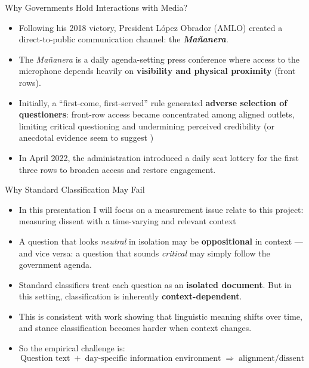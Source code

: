 \documentclass[10pt,aspectratio=169]{beamer}
\begin{document}
\begin{frame}{Why Governments Hold Interactions with Media?}
\begin{itemize}
  \setlength\itemsep{1em}


  \item Following his 2018 victory, President L\'opez Obrador (AMLO) created a direct-to-public communication channel: the \textbf{\textit{Mañanera}}.

  \item The \textit{Mañanera} is a daily agenda-setting press conference where access to the microphone depends heavily on \textbf{visibility and physical proximity} (front rows).

  \item Initially, a ``first-come, first-served'' rule generated \textbf{adverse selection of questioners}: front-row access became concentrated among aligned outlets, limiting critical questioning and undermining perceived credibility (or anecdotal evidence seem to suggest \citep{Tombola-Razon})

  \item In April 2022, the administration introduced a \alert{daily seat lottery} for the first three rows to broaden access and restore engagement.
\end{itemize}
\end{frame}

\begin{frame}{Why Standard Classification May Fail}
\small
\begin{itemize}\setlength\itemsep{0.6em}
    \item In this presentation I will focus on a measurement issue relate to this project: measuring dissent with a time-varying and relevant context
    \item A question that looks \textit{neutral} in isolation may be \textbf{oppositional} in context --- and vice versa: a question that sounds \textit{critical} may simply follow the government agenda.
    
    \item Standard classifiers treat each question as an \textbf{isolated document}. But in this setting, classification is inherently \textbf{context-dependent}.
    
    \item This is consistent with work showing that linguistic meaning shifts over time, and stance classification becomes harder when context changes. \citep{mu2024examining, li2023stance, sucu2025exploiting}
    
    \item So the empirical challenge is:
    \[
    \text{Question text} \;+\; \text{day-specific information environment}
    \;\Rightarrow\; \text{alignment/dissent}
    \]
\end{itemize}
\end{frame}
\end{document}
